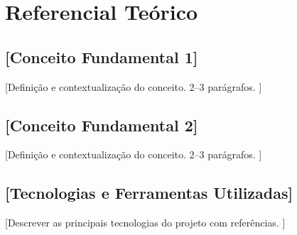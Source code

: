 \section{Referencial Teórico}
\label{sec:referencial}


\subsection{[Conceito Fundamental 1]}
[Definição e contextualização do conceito. 2–3 parágrafos. \cite{article_stub}]

\subsection{[Conceito Fundamental 2]}
[Definição e contextualização do conceito. 2–3 parágrafos. \cite{book_stub}]

\subsection{[Tecnologias e Ferramentas Utilizadas]}
[Descrever as principais tecnologias do projeto com referências. \cite{misc_stub}]
